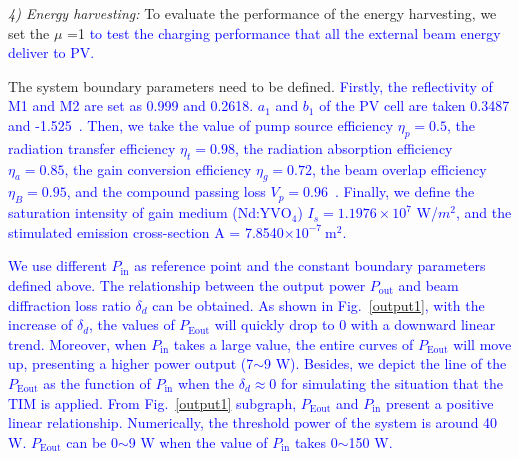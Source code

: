 \documentclass{IEEEtran}
\begin{document}
\emph{4) Energy harvesting:}
To evaluate the performance of the energy harvesting, we set the $\mu$ =1 \textcolor{blue}{to test the charging performance that all the external beam energy deliver to PV.} 

The system boundary parameters need to be defined. 
\textcolor{blue}{Firstly, the reflectivity of M1 and M2 are set as 0.999 and 0.2618. $a_1$ and $b_1$ of the PV cell are taken 0.3487 and -1.525~\cite{wang2019wireless}.
Then, we take the value of pump source efficiency $\eta_p=0.5$, the radiation transfer efficiency $\eta_t = 0.98$, the radiation absorption efficiency $\eta_a=0.85$, the gain conversion efficiency $\eta_g=0.72$, the beam overlap efficiency $\eta_B=0.95$, and the compound passing loss $V_p=0.96$~\cite{koechner2013solid}. Finally, we define the saturation intensity of gain medium (Nd:YV$\mathrm{O_4}$) $I_s = 1.1976\times10^7$ W/$m^2$, and the stimulated emission cross-section A = 7.8540$\times10^{-7}~\mathrm{m^2}$. } 

\textcolor{blue}{We use different $P_\mathrm{in}$ as reference point and the constant boundary parameters defined above. The relationship between the output power $P_\mathrm{out}$ and beam diffraction loss ratio $\delta_d$ can be obtained. 
As shown in Fig.~\ref{output1}, with the increase of $\delta_d$, the values of $P_\mathrm{Eout}$ will quickly drop to 0 with a downward linear trend. Moreover, when $P_\mathrm{in}$ takes a large value, the entire curves of $P_\mathrm{Eout}$ will move up, presenting a higher power output (7$\sim$9 W). %
Besides, we depict the line of the $P_\mathrm{Eout}$ as the function of $P_\mathrm{in}$ when the $\delta_d\approx 0$ for simulating the situation that the TIM is applied. From Fig.~\ref{output1} subgraph, $P_\mathrm{Eout}$ and $P_\mathrm{in}$ present a positive linear relationship.
Numerically, the threshold power of the system is around 40 W. $P_\mathrm{Eout}$ can be 0$\sim$9 W when the value of $P_\mathrm{in}$ takes 0$\sim$150 W. }
\end{document}

